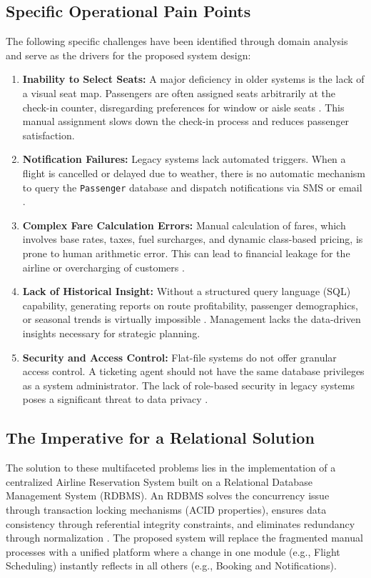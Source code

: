 \documentclass[12pt, a4paper]{article}
\begin{document}
	\subsection{Specific Operational Pain Points}
	The following specific challenges have been identified through domain analysis and serve as the drivers for the proposed system design:
	
	\begin{enumerate}
		\item \textbf{Inability to Select Seats:} A major deficiency in older systems is the lack of a visual seat map. Passengers are often assigned seats arbitrarily at the check-in counter, disregarding preferences for window or aisle seats \cite{ref10}. This manual assignment slows down the check-in process and reduces passenger satisfaction.
		\item \textbf{Notification Failures:} Legacy systems lack automated triggers. When a flight is cancelled or delayed due to weather, there is no automatic mechanism to query the \texttt{Passenger} database and dispatch notifications via SMS or email \cite{ref13, ref18}.
		\item \textbf{Complex Fare Calculation Errors:} Manual calculation of fares, which involves base rates, taxes, fuel surcharges, and dynamic class-based pricing, is prone to human arithmetic error. This can lead to financial leakage for the airline or overcharging of customers \cite{ref2}.
		\item \textbf{Lack of Historical Insight:} Without a structured query language (SQL) capability, generating reports on route profitability, passenger demographics, or seasonal trends is virtually impossible \cite{ref19}. Management lacks the data-driven insights necessary for strategic planning.
		\item \textbf{Security and Access Control:} Flat-file systems do not offer granular access control. A ticketing agent should not have the same database privileges as a system administrator. The lack of role-based security in legacy systems poses a significant threat to data privacy \cite{ref20}.
	\end{enumerate}
	
	\subsection{The Imperative for a Relational Solution}
	The solution to these multifaceted problems lies in the implementation of a centralized Airline Reservation System built on a Relational Database Management System (RDBMS). An RDBMS solves the concurrency issue through transaction locking mechanisms (ACID properties), ensures data consistency through referential integrity constraints, and eliminates redundancy through normalization \cite{ref12}. The proposed system will replace the fragmented manual processes with a unified platform where a change in one module (e.g., Flight Scheduling) instantly reflects in all others (e.g., Booking and Notifications).
	
\end{document}

